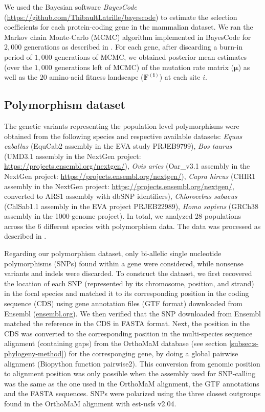 \documentclass{article}
\newcommand{\UniDimArray}[1]{\bm{#1}}
\begin{document}
    We used the Bayesian software \textit{BayesCode} (\url{https://github.com/ThibaultLatrille/bayescode}) to estimate the selection coefficients for each protein-coding gene in the mammalian dataset.
    We ran the Markov chain Monte-Carlo (MCMC) algorithm implemented in BayesCode for $2,000$ generations as described in \textcite{latrille_genes_2023}.
    For each gene, after discarding a burn-in period of $1,000$ generations of MCMC, we obtained posterior mean estimates (over the $1,000$ generations left of MCMC) of the mutation rate matrix ($\UniDimArray{\mu}$) as well as the $20$ amino-acid fitness landscape ($\UniDimArray{F^{(i)}}$) at each site $i$.

    \subsection{Polymorphism dataset}
    \label{subsec:polymorphism-dataset}

    The genetic variants representing the population level polymorphisms were obtained from the following species and respective available datasets: \textit{Equus caballus} (EquCab2 assembly in the EVA study PRJEB9799\cite{alabri_whole_2020}), \textit{Bos taurus} (UMD3.1 assembly in the NextGen project: \url{https://projects.ensembl.org/nextgen/}), \textit{Ovis aries} (Oar\_v3.1 assembly in the NextGen project: \url{https://projects.ensembl.org/nextgen/}), \textit{Capra hircus} (CHIR1 assembly in the NextGen project: \url{https://projects.ensembl.org/nextgen/}, converted to ARS1 assembly with dbSNP identifiers\cite{sherry_dbsnp_2001}), \textit{Chlorocebus sabaeus} (ChlSab1.1 assembly in the EVA project PRJEB22989\cite{svardal_ancient_2017}), \textit{Homo sapiens} (GRCh38 assembly in the 1000-genome project\cite{zheng-bradley_alignment_2017}).
    In total, we analyzed 28 populations across the 6 different species with polymorphism data.
    The data was processed as described in \textcite{latrille_genes_2023}.

    Regarding our polymorphism dataset, only bi-allelic single nucleotide polymorphisms (SNPs) found within a gene were considered, while nonsense variants and indels were discarded.
    To construct the dataset, we first recovered the location of each SNP (represented by its chromosome, position, and strand) in the focal species and matched it to its corresponding position in the coding sequence (CDS) using gene annotation files (GTF format) downloaded from Ensembl (\url{ensembl.org}).
    We then verified that the SNP downloaded from Ensembl matched the reference in the CDS in FASTA format.
    Next, the position in the CDS was converted to the corresponding position in the multi-species sequence alignment (containing gaps) from the OrthoMaM database (see section \ref{subsec:s-phylogeny-method}) for the corresponging gene, by doing a global pairwise alignment (Biopython function pairwise2).
    This conversion from genomic position to alignment position was only possible when the assembly used for SNP-calling was the same as the one used in the OrthoMaM alignment, the GTF annotations and the FASTA sequences.
    SNPs were polarized using the three closest outgroups found in the OrthoMaM alignment with est-usfs v2.04\cite{keightley_inferring_2018}.
\end{document}
